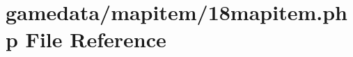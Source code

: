 \hypertarget{18mapitem_8php}{\section{gamedata/mapitem/18mapitem.php File Reference}
\label{18mapitem_8php}
}

